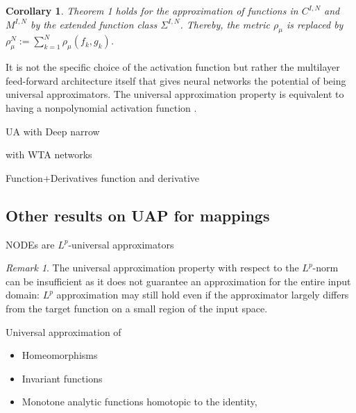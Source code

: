 \documentclass{article}
\newtheorem{corollary}{Corollary}[theorem]
\theoremstyle{definition}
\theoremstyle{remark}
\newtheorem{remark}{Remark}
\newcounter{ct}
\begin{document}
\begin{corollary}%
Theorem 1 holds for the approximation of functions in \( C^{I,N} \) and \( M^{I,N} \) by the extended function class \( \Sigma^{I,N} \). Thereby, the metric \( \rho_{\mu} \) is replaced by \( \rho_{\mu}^N := \sum_{k=1}^{N} \rho_{\mu}(f_k, g_k) \).
\end{corollary}



It is not the specific choice of the activation function but rather the multilayer feed-forward architecture itself that gives neural networks the potential of being universal approximators\citep{hornik1991approximation}.
%
The universal approximation property is equivalent to having a nonpolynomial activation function \citep{pinkus1999approximation}.

\citep{mhaskar1997neural}
\citep{leshno1993multilayer}

UA with Deep narrow \citep{kidger2020universal}

with WTA networks \citep{maass2000wta}

Function+Derivatives \citep{hornik1990universal}
function and derivative \citep{li1996simultaneous}


\subsection{Other results on UAP for mappings}
NODEs are $L^p$-universal approximators \citep{li2022deep,li2022deeparxiv}
\begin{remark}
The universal approximation property with respect to the $L^p$-norm can be insufficient as it does not guarantee an approximation for the entire input domain:
 $L^p$ approximation may still hold even if the approximator largely differs from the target function on a small region of the input space.
\end{remark}


Universal approximation of 
\begin{itemize}
\item Homeomorphisms \citep{zhang2020approximation}
\item Invariant functions\citep{li2022deep}
\item Monotone analytic functions homotopic to the identity\citep{tabuada2020universal}, \citep{tabuada2022universal}
\end{itemize}
\end{document}
